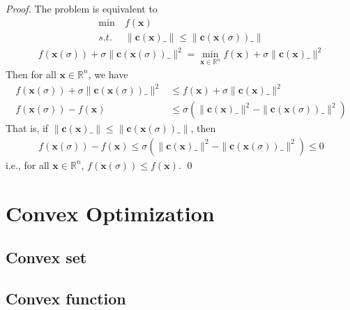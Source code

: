 \documentclass[runningheads]{llncs}
\begin{document}
\begin{proof}
    The problem is equivalent to
    \begin{align}
        \min \ &f(\mathbf{x}) \\
        s.t. \ &\parallel \mathbf{c}
        (\mathbf{x})\_ \parallel \leq
        \parallel \mathbf{c}
        (\mathbf{x}(\sigma))\_ \parallel
    \end{align}
    \begin{align}
        f(\mathbf{x}(\sigma)) + \sigma \parallel \mathbf{c}
        (\mathbf{x}(\sigma))\_ \parallel^2 = 
        \min_{\mathbf{x} \in \mathbb{R}^n}
        f(\mathbf{x}) + \sigma \parallel \mathbf{c}
        (\mathbf{x})\_ \parallel^2
    \end{align}
    Then for all $\mathbf{x} \in \mathbb{R}^n$, we have
    \begin{align}
        f(\mathbf{x}(\sigma)) + \sigma \parallel \mathbf{c}
        (\mathbf{x}(\sigma))\_ \parallel^2 &\leq 
        f(\mathbf{x}) + \sigma \parallel \mathbf{c}
        (\mathbf{x})\_ \parallel^2 \\
        f(\mathbf{x}(\sigma)) - f(\mathbf{x}) &\leq
        \sigma(\parallel \mathbf{c}
        (\mathbf{x})\_ \parallel^2 - \parallel \mathbf{c}
        (\mathbf{x}(\sigma))\_ \parallel^2)
    \end{align}
    That is, if $\parallel \mathbf{c}
    (\mathbf{x})\_ \parallel \leq \parallel \mathbf{c}
    (\mathbf{x}(\sigma))\_ \parallel$, then
    \begin{align}
        f(\mathbf{x}(\sigma)) - f(\mathbf{x}) \leq
        \sigma(\parallel \mathbf{c}
        (\mathbf{x})\_ \parallel^2 - \parallel \mathbf{c}
        (\mathbf{x}(\sigma))\_ \parallel^2) \leq 0
    \end{align}
    i.e., for all $\mathbf{x} \in \mathbb{R}^n$,
    $f(\mathbf{x}(\sigma)) \leq f(\mathbf{x})$.
    \qed
\end{proof}





\clearpage
\section{Convex Optimization}
\subsection{Convex set}
\subsection{Convex function}
\end{document}
